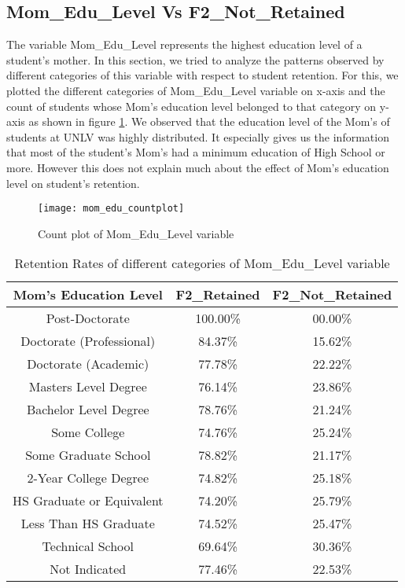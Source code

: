 \documentclass[11pt,openright]{report}
\begin{document}
\subsection {Mom\_Edu\_Level	 Vs F2\_Not\_Retained}
The variable Mom\_Edu\_Level represents the highest education level of a student's mother. In this section, we tried to analyze the patterns observed by different categories of this variable with respect to student retention. For this, we plotted the different categories of Mom\_Edu\_Level variable on x-axis and the count of students whose Mom's education level belonged to that category on y-axis as shown in figure \ref{fig:mom_edu_F2NotRetained_plot}. We observed that the education level of the Mom's of students at UNLV was highly distributed. It especially gives us the information that most of the student's Mom's had a minimum education of High School or more. However this does not explain much about the effect of Mom's education level on student's retention.

\begin{figure}[!ht]
	\centering
	\texttt{[image: mom\_edu\_countplot]}
	\caption{Count plot of Mom\_Edu\_Level variable}
	\label{fig:mom_edu_F2NotRetained_plot}
\end{figure}

\begin{table}[!t]
	\renewcommand{\arraystretch}{1.3}
	\caption{Retention Rates of different categories of Mom\_Edu\_Level variable}
	\label{table:mom_edu_retentions}
	\centering
	\begin{tabular}{|c|c|c|}
		\hline
		\bfseries Mom's Education Level & \bfseries F2\_Retained & \bfseries F2\_Not\_Retained\\
		\hline
		Post-Doctorate  & 100.00\%  & 00.00\% \\ \hline
		Doctorate (Professional) & 84.37\% &  15.62\% \\ \hline
		Doctorate (Academic) & 77.78\% & 22.22\% \\ \hline
		Masters Level Degree    &   76.14\% &  23.86\% \\ \hline
		Bachelor Level Degree &  78.76\%  & 21.24\% \\ \hline
		Some College & 74.76\% & 25.24\% \\ \hline
		Some Graduate School  & 78.82\% &  21.17\% \\ \hline
		2-Year College Degree    &  74.82\%  & 25.18\% \\ \hline
		HS Graduate or Equivalent  & 74.20\% &  25.79\% \\ \hline
		Less Than HS Graduate     & 74.52\% &  25.47\% \\ \hline
		Technical School  &         69.64\% &  30.36\% \\ \hline
		Not Indicated         &    77.46\% & 22.53\% \\ \hline
	\end{tabular}
\end{table}
\end{document}
